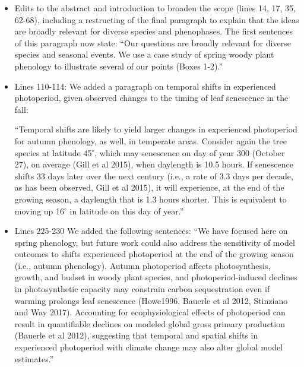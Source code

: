 \documentclass{article}
\begin{document}
\begin{itemize}
\item Edits to the abstract and introduction to broaden the scope (lines 14, 17, 35,  62-68), including a restructing of the final paragraph to explain that the ideas are broadly relevant for diverse species and phenophases. The first sentences of this paragraph now state: ``Our questions are broadly relevant for diverse species and seasonal events. We use a case study of spring woody plant phenology to illustrate several of our points (Boxes 1-2).''  
\item Lines 110-114: We added a paragraph on temporal shifts in experienced photoperiod, given observed changes to the timing of leaf senescence in the fall: 
\par ``Temporal shifts are likely to yield larger changes in experienced photoperiod for autumn phenology, as well, in temperate areas. Consider again the tree species at latitude 45$^{\circ}$, which may senescence on day of year 300 (October 27), on average (Gill et al 2015), when daylength is 10.5 hours. If senescence shifts 33 days later over the next century (i.e., a rate of 3.3 days per decade, as has been observed, Gill et al 2015), it will experience, at the end of the growing season, a daylength that is 1.3 hours shorter. This is equivalent to moving up 16$^{\circ}$ in latitude on this day of year.''
\item Lines 225-230 We added the following sentences: ``We have focused here on spring phenology, but future work could also address the sensitivity of model outcomes to shifts experienced photoperiod at the end of the growing season (i.e., autumn phenology). Autumn photoperiod affects photosynthesis, growth, and budset in woody plant species, and photoperiod-induced declines in photosynthetic capacity may constrain carbon sequestration even if warming prolongs leaf senescence (Howe1996, Bauerle et al 2012, Stinziano and Way 2017). Accounting for ecophysiological effects of photoperiod can result in quantifiable declines on modeled global gross primary production (Bauerle et al 2012), suggesting that temporal and spatial shifts in experienced photoperiod with climate change may also alter global model estimates.''


\end{itemize}
\end{document}
